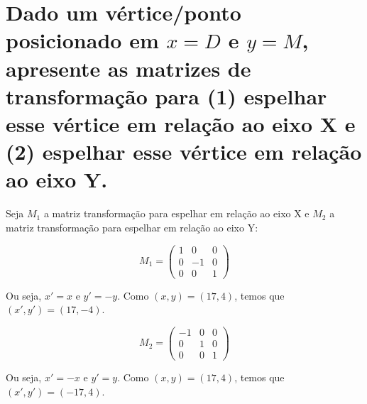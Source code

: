\documentclass{article}
\begin{document}
\section{Dado um vértice/ponto posicionado em $x = D$ e $y = M$, apresente as matrizes de transformação para (1) espelhar esse vértice em relação ao eixo X e (2) espelhar esse vértice em relação ao eixo Y.}

Seja $M_1$ a matriz transformação para espelhar em relação ao eixo X e $M_2$ a matriz transformação para espelhar em relação ao eixo Y:

$$M_1 = \begin{pmatrix}
	1 & 0 & 0\\
	0 & -1 & 0\\
	0 & 0 & 1
\end{pmatrix}$$

Ou seja, $x' = x$ e $y' = -y$. Como $(x, y) = (17, 4)$, temos que $(x', y') = (17, -4)$.


$$M_2 = \begin{pmatrix}
	-1 & 0 & 0\\
	0 & 1 & 0\\
	0 & 0 & 1
\end{pmatrix}$$


Ou seja, $x' = -x$ e $y' = y$. Como $(x, y) = (17, 4)$, temos que $(x', y') = (-17, 4)$.
\end{document}
